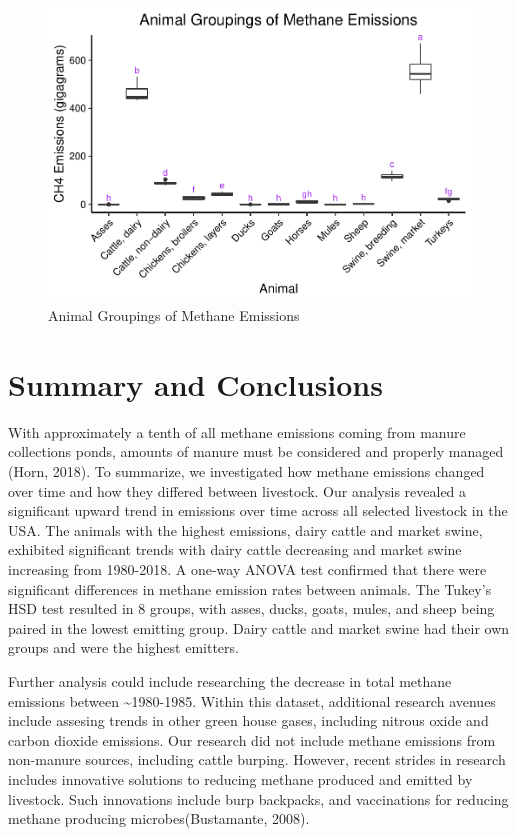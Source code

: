 \documentclass[
  12pt,
]{article}
\begin{document}
\begin{figure}
\centering
\includegraphics{Methane_Project_Template_files/figure-latex/anova results-1.pdf}
\caption{Animal Groupings of Methane Emissions}
\end{figure}

\newpage

\hypertarget{summary-and-conclusions}{%
\section{Summary and Conclusions}\label{summary-and-conclusions}}

With approximately a tenth of all methane emissions coming from manure
collections ponds, amounts of manure must be considered and properly
managed (Horn, 2018). To summarize, we investigated how methane
emissions changed over time and how they differed between livestock. Our
analysis revealed a significant upward trend in emissions over time
across all selected livestock in the USA. The animals with the highest
emissions, dairy cattle and market swine, exhibited significant trends
with dairy cattle decreasing and market swine increasing from 1980-2018.
A one-way ANOVA test confirmed that there were significant differences
in methane emission rates between animals. The Tukey's HSD test resulted
in 8 groups, with asses, ducks, goats, mules, and sheep being paired in
the lowest emitting group. Dairy cattle and market swine had their own
groups and were the highest emitters.

Further analysis could include researching the decrease in total methane
emissions between \textasciitilde1980-1985. Within this dataset,
additional research avenues include assesing trends in other green house
gases, including nitrous oxide and carbon dioxide emissions. Our
research did not include methane emissions from non-manure sources,
including cattle burping. However, recent strides in research includes
innovative solutions to reducing methane produced and emitted by
livestock. Such innovations include burp backpacks, and vaccinations for
reducing methane producing microbes(Bustamante, 2008).
\end{document}
